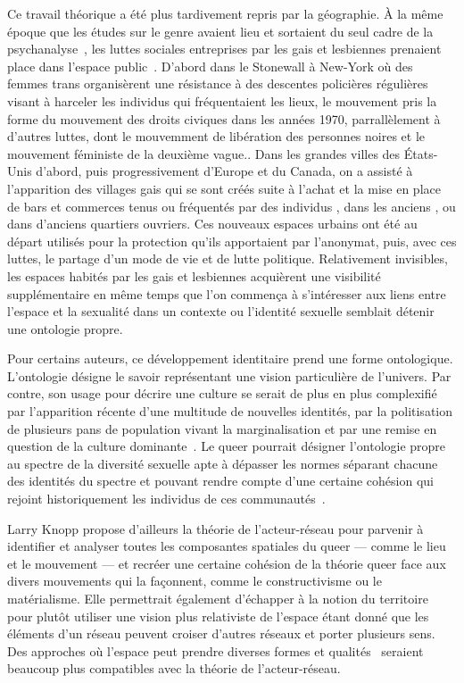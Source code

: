 Ce travail théorique a été plus tardivement repris par la géographie.
À la même époque que les études sur le genre avaient lieu et sortaient du seul cadre de la psychanalyse~\citep{Rubin2011a,Rubin2011}, les luttes sociales entreprises par les gais et lesbiennes prenaient place dans l'espace public~\citep[422-427]{Spencer2005}.
D'abord dans le Stonewall à New-York où des femmes trans organisèrent une résistance à des descentes policières régulières visant à harceler les individus \lgbt{} qui fréquentaient les lieux, le mouvement pris la forme du mouvement des droits civiques dans les années 1970, parrallèlement à d'autres luttes, dont le mouvemment de libération des personnes noires  et le mouvement féministe de la deuxième vague..
Dans les grandes villes des États-Unis d'abord, puis progressivement d'Europe et du Canada, on a assisté à l'apparition des villages gais qui se sont créés suite à l'achat et la mise en place de bars et commerces tenus ou fréquentés par des individus \lgbt{}, dans les anciens , ou dans d'anciens quartiers ouvriers.
Ces nouveaux espaces urbains ont été au départ utilisés pour la protection qu'ils apportaient par l'anonymat, puis, avec ces luttes, le partage d'un mode de vie et de lutte politique.
Relativement invisibles, les espaces  habités par les gais et lesbiennes acquièrent une visibilité supplémentaire en même temps que l'on commença à s'intéresser aux liens entre l'espace et la sexualité dans un contexte ou l'identité sexuelle semblait détenir une ontologie propre.

Pour certains auteurs, ce développement identitaire prend une forme ontologique.
L'ontologie désigne le savoir représentant une vision particulière de l'univers.
Par contre, son usage pour décrire une culture se serait de plus en plus complexifié par l'apparition récente d'une multitude de nouvelles identités, par la politisation de plusieurs pans de population vivant la marginalisation et par une remise en question de la culture dominante~\citep[122]{Knopp2004}.
Le queer pourrait désigner l'ontologie propre au spectre de la diversité sexuelle apte à dépasser les normes séparant chacune des identités du spectre \lgbt{} et pouvant rendre compte d'une certaine cohésion qui rejoint historiquement les individus de ces communautés~\citep[122]{Knopp2004}.

Larry Knopp propose d'ailleurs la théorie de l'acteur-réseau pour parvenir à identifier et analyser toutes les composantes spatiales du queer --- comme le lieu et le mouvement --- et recréer une certaine cohésion de la théorie queer face aux divers mouvements qui la façonnent, comme le constructivisme ou le matérialisme.
Elle permettrait également d'échapper à la notion du territoire pour plutôt utiliser une vision plus relativiste de l'espace étant donné que les éléments d'un réseau peuvent croiser d'autres réseaux et porter plusieurs sens.
Des approches où l'espace peut prendre diverses formes et qualités~\citep{DiMeo1998} seraient beaucoup plus compatibles avec la théorie de l'acteur-réseau.

